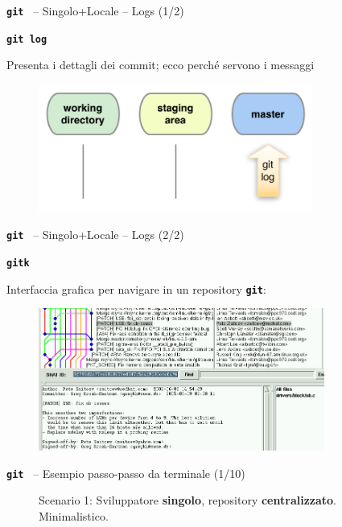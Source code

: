 \documentclass{beamer}
\newcommand{\git}{\texttt{\textbf{git}}\xspace}
\begin{document}
\begin{frame}{\centerline{ \git ~ -- Singolo+Locale -- Logs (1/2)}}
  \begin{center}
    \texttt{\textbf{git log}}
  \end{center}
  Presenta i dettagli dei commit; ecco perch\'{e} servono i messaggi
  \begin{figure}
    \centering
    \includegraphics[width=9cm]{A2023.LavoroCondiviso/local-log}
  \end{figure}
\end{frame}

\begin{frame}{\centerline{ \git ~ -- Singolo+Locale -- Logs (2/2) }}
  \begin{center}
    \texttt{\textbf{gitk}}
  \end{center}
  Interfaccia grafica per navigare in un repository \git:
  \begin{figure}
    \centering
    \includegraphics[width=9.4cm]{A2023.LavoroCondiviso/gitk_cropped}
  \end{figure}
\end{frame}


\begin{frame}{\centerline{\git ~ -- Esempio passo-passo da terminale (1/10)}}
  \begin{figure}
    \centering
    Scenario 1: Sviluppatore \textbf{singolo}, repository \textbf{centralizzato}. Minimalistico.
  \end{figure}
\end{frame}
\end{document}
